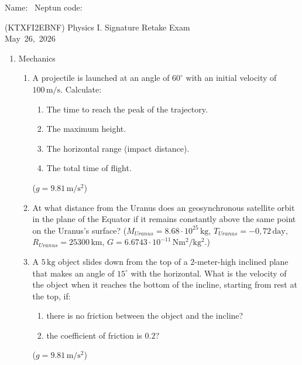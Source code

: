 \documentclass[a4paper,12pt]{letter}
\begin{document}
Name: \hrulefill\ Neptun code: \hrulefill

\bigskip

\begin{center}
(KTXFI2EBNF) Physics I. Signature Retake Exam \\
May~26,~2026
\end{center}

\bigskip
 
\begin{enumerate}[label=\Roman*.]
   
\item Mechanics

\begin{enumerate}[label=\arabic*.]
\setcounter{enumii}{0} %


\item A projectile is launched at an angle of $60^\circ$ with an initial velocity of $100\,\text{m/s}$. 
Calculate:
\begin{enumerate}
    \item[(a)] The time to reach the peak of the trajectory.
    \item[(b)] The maximum height.
    \item[(c)] The horizontal range (impact distance).
    \item[(d)] The total time of flight.
    \end{enumerate}
($g=9.81\,\mathrm{m/s^{2}}$)     


\item At what distance from the Uranus does an geosynchronous satellite orbit in the plane of the Equator if it remains constantly above the same point on the Uranus's surface? ($M_{Uranus}=8.68\cdot 10^{25}\,\mathrm{kg}$, $T_{Uranus}=-0,72 \,\mathrm{day}$, $R_{Uranus}=25300\,\mathrm{km}$, $G=6.6743\cdot 10^{-11}\,\mathrm{Nm^2/kg^2}$.)  


\item A $5\,\text{kg}$ object slides down from the top of a $2\text{-meter-high}$ inclined plane that makes an angle of $15^\circ$ with the horizontal. What is the velocity of the object when it reaches the bottom of the incline, starting from rest at the top, if:
\begin{enumerate}
    \item[(a)] there is no friction between the object and the incline?
    \item[(b)] the coefficient of friction is $0.2$?
\end{enumerate}
($g=9.81\,\mathrm{m/s^{2}}$)    


\end{enumerate}
\end{enumerate}
\end{document}
